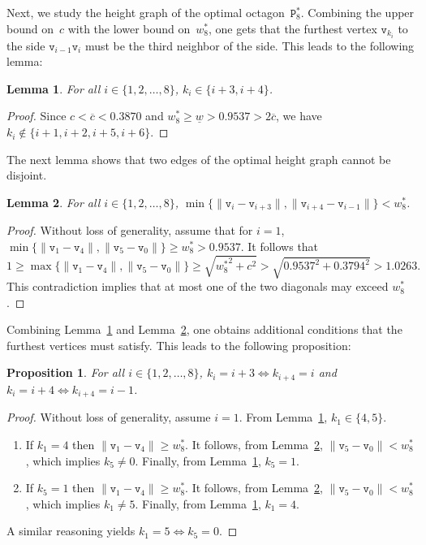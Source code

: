 \documentclass[a4paper,12pt]{article}
\theoremstyle{definition}
\theoremstyle{plain}
\newtheorem{lemma}{Lemma}
\newtheorem{proposition}{Proposition}
\newcommand{\ub}[1]{\overline{#1}}
\newcommand{\lb}[1]{\underline{#1}}
\newcommand{\geo}[1]{\mathtt{#1}}
\begin{document}
Next, we study the height graph of the optimal octagon~$\geo{P}_8^*$. Combining the upper bound on~$c$ with the lower bound on~$w_8^*$, one gets that the furthest vertex $\geo{v}_{k_i}$ to the side $\geo{v}_{i-1}\geo{v}_i$ must be the third neighbor of the side. This leads to the following lemma:
\begin{lemma}\label{lemma:ki}
	For all $i \in \{1,2,\ldots,8\}$, $k_i \in \{i+3,i+4\}$.
\end{lemma}
\begin{proof}
	Since $c < \ub{c} < 0.3870$ and $w_8^* \ge \lb{w} > 0.9537 > 2\ub{c}$, we have $k_i \not\in\{i+1, i+2, i+5,i+6\}$.
\end{proof}
The next lemma shows that two edges of the optimal height graph cannot be disjoint.
\begin{lemma}\label{lemma:ki:4gon}
	For all $i \in \{1,2,\ldots,8\}$, $\min \{\|\geo{v}_i-\geo{v}_{i+3}\|, \|\geo{v}_{i+4}-\geo{v}_{i-1}\|\} < w_8^*$.
\end{lemma}
\begin{proof}
	Without loss of generality, assume that for $i=1$, $\min\{\|\geo{v}_1-\geo{v}_4\|,\|\geo{v}_5-\geo{v}_0\|\} \ge w_8^* > 0.9537$. It follows that
	\[
	1 \ge \max\{\|\geo{v}_1-\geo{v}_4\|,\|\geo{v}_5-\geo{v}_0\|\} \ge \sqrt{{w_8^*}^2 + c^2} > \sqrt{0.9537^2 + 0.3794^2} > 1.0263.
	\]
	This contradiction implies that at most one of the two diagonals may exceed $w_8^*$.
\end{proof}

Combining Lemma~\ref{lemma:ki} and Lemma~\ref{lemma:ki:4gon}, one obtains additional conditions that the furthest vertices must satisfy. This leads to the following proposition:

\begin{proposition}\label{thm:ki:height}
	For all $i \in \{1,2,\ldots,8\}$, $k_i = i + 3 \Leftrightarrow k_{i+4} = i$ and $k_i = i + 4 \Leftrightarrow k_{i+4} = i-1$.
\end{proposition}
\begin{proof}
	Without loss of generality, assume $i=1$. From Lemma~\ref{lemma:ki}, $k_1 \in \{4,5\}$.
	\begin{enumerate}
		\item If $k_1 = 4$ then $\|\geo{v}_1-\geo{v}_4\| \ge w_8^*$. It follows, from Lemma~\ref{lemma:ki:4gon}, $\|\geo{v}_5-\geo{v}_0\| < w_8^*$, which implies $k_5 \not= 0$. Finally, from Lemma~\ref{lemma:ki}, $k_5 = 1$.
		\item If $k_5 = 1$ then $\|\geo{v}_1-\geo{v}_4\| \ge w_8^*$. It follows, from Lemma~\ref{lemma:ki:4gon}, $\|\geo{v}_5-\geo{v}_0\| < w_8^*$, which implies $k_1 \not= 5$. Finally, from Lemma~\ref{lemma:ki}, $k_1 = 4$.
	\end{enumerate}
A similar reasoning yields $k_1 = 5 \Leftrightarrow k_5 = 0$.
\end{proof}
\end{document}
